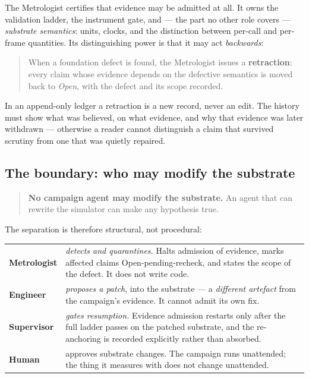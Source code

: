 \documentclass[11pt]{article}
\begin{document}
The Metrologist certifies that evidence may be admitted at all. It owns the validation ladder, the
instrument gate, and --- the part no other role covers --- \emph{substrate semantics}: units,
clocks, and the distinction between per-call and per-frame quantities. Its distinguishing power is
that it may act \emph{backwards}:

\begin{quote}
When a foundation defect is found, the Metrologist issues a \textbf{retraction}: every claim whose
evidence depends on the defective semantics is moved back to \emph{Open}, with the defect and its
scope recorded.
\end{quote}

In an append-only ledger a retraction is a new record, never an edit. The history must show what
was believed, on what evidence, and why that evidence was later withdrawn --- otherwise a reader
cannot distinguish a claim that survived scrutiny from one that was quietly repaired.

\subsection{The boundary: who may modify the substrate}

\begin{quote}
\textbf{No campaign agent may modify the substrate.} An agent that can rewrite the simulator can
make any hypothesis true.
\end{quote}

The separation is therefore structural, not procedural:

\begin{center}\small
\begin{tabular}{@{}p{2.6cm}p{11.6cm}@{}}
\toprule
\textbf{Metrologist} & \emph{detects and quarantines.} Halts admission of evidence, marks affected
claims Open-pending-recheck, and states the scope of the defect. It does not write code. \\
\textbf{Engineer} & \emph{proposes a patch}, into the substrate --- a \emph{different artefact}
from the campaign's evidence. It cannot admit its own fix. \\
\textbf{Supervisor} & \emph{gates resumption.} Evidence admission restarts only after the full
ladder passes on the patched substrate, and the re-anchoring is recorded explicitly rather than
absorbed. \\
\textbf{Human} & approves substrate changes. The campaign runs unattended; the thing it measures
with does not change unattended. \\
\bottomrule
\end{tabular}
\end{center}
\end{document}
